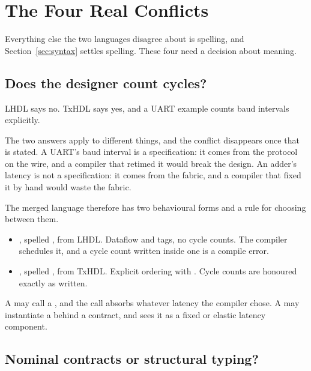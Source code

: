 \section{The Four Real Conflicts}
\label{sec:conflicts}

Everything else the two languages disagree about is spelling, and
Section~\ref{sec:syntax} settles spelling. These four need a decision about
meaning.

\subsection{Does the designer count cycles?}

LHDL says no. TxHDL says yes, and a UART example counts baud intervals
explicitly.

\begin{rulebox}
The two answers apply to different things, and the conflict disappears once
that is stated. A UART's baud interval is a specification: it comes from the
protocol on the wire, and a compiler that retimed it would break the design.
An adder's latency is not a specification: it comes from the fabric, and a
compiler that fixed it by hand would waste the fabric.
\end{rulebox}

The merged language therefore has two behavioural forms and a rule for
choosing between them.

\begin{itemize}
  \item {}, spelled , from LHDL. Dataflow and
        tags, no cycle counts. The compiler schedules it, and a cycle count
        written inside one is a compile error.
  \item {}, spelled , from TxHDL. Explicit
        ordering with . Cycle counts are honoured exactly as
        written.
\end{itemize}

A  may call a , and the call absorbs whatever latency
the compiler chose. A  may instantiate a  behind a
contract, and sees it as a fixed or elastic latency component.

\subsection{Nominal contracts or structural typing?}

